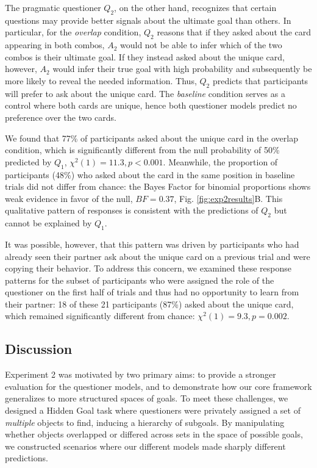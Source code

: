 \documentclass[12pt, floatsintext, jou]{apa6}
\begin{document}
The pragmatic questioner $Q_2$, on the other hand, recognizes that certain questions may provide better signals about the ultimate goal than others.
In particular, for the \emph{overlap} condition, $Q_2$ reasons that if they asked about the card appearing in both combos, $A_2$ would not be able to infer which of the two combos is their ultimate goal.
If they instead asked about the unique card, however, $A_2$ would infer their true goal with high probability and subsequently be more likely to reveal the needed information.
Thus, $Q_2$ predicts that participants will prefer to ask about the unique card.
The \emph{baseline} condition serves as a control where both cards are unique, hence both questioner models predict no preference over the two cards.

We found that 77\% of participants asked about the unique card in the overlap condition, which is significantly different from the null probability of 50\% predicted by $Q_1$, $\chi^2(1) = 11.3, p < 0.001$. 
Meanwhile, the proportion of participants (48\%) who asked about the card in the same position in baseline trials did not differ from chance: the Bayes Factor for binomial proportions  \cite{morey2016philosophy, morey2015package} shows weak evidence in favor of the null, $BF = 0.37$, Fig. \ref{fig:exp2results}B. 
This qualitative pattern of responses is consistent with the predictions of $Q_2$ but cannot be explained by $Q_1$.

It was possible, however, that this pattern was driven by participants who had already seen their partner ask about the unique card on a previous trial and were copying their behavior. 
To address this concern, we examined these response patterns for the subset of participants who were assigned the role of the questioner on the first half of trials and thus had no opportunity to learn from their partner: 18 of these 21 participants (87\%) asked about the unique card, which remained significantly different from chance: $\chi^2(1) = 9.3, p = 0.002$.

\subsection{Discussion}

Experiment 2 was motivated by two primary aims: to provide a stronger evaluation for the questioner models, and to demonstrate how our core framework generalizes to more structured spaces of goals.
To meet these challenges, we designed a Hidden Goal task where questioners were privately assigned a set of \emph{multiple} objects to find, inducing a hierarchy of subgoals.
By manipulating whether objects overlapped or differed across sets in the space of possible goals, we constructed scenarios where our different models made sharply different predictions. 
\end{document}
